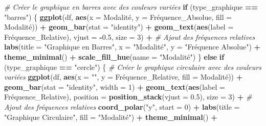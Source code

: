 \documentclass[
]{article}
\newenvironment{Shaded}{\begin{snugshade}}{\end{snugshade}}
\newcommand{\AttributeTok}[1]{\textcolor[rgb]{0.13,0.29,0.53}{#1}}
\newcommand{\CommentTok}[1]{\textcolor[rgb]{0.56,0.35,0.01}{\textit{#1}}}
\newcommand{\ControlFlowTok}[1]{\textcolor[rgb]{0.13,0.29,0.53}{\textbf{#1}}}
\newcommand{\DecValTok}[1]{\textcolor[rgb]{0.00,0.00,0.81}{#1}}
\newcommand{\FloatTok}[1]{\textcolor[rgb]{0.00,0.00,0.81}{#1}}
\newcommand{\FunctionTok}[1]{\textcolor[rgb]{0.13,0.29,0.53}{\textbf{#1}}}
\newcommand{\NormalTok}[1]{#1}
\newcommand{\SpecialCharTok}[1]{\textcolor[rgb]{0.81,0.36,0.00}{\textbf{#1}}}
\newcommand{\StringTok}[1]{\textcolor[rgb]{0.31,0.60,0.02}{#1}}
\begin{document}
\begin{Shaded}
\begin{Highlighting}[]
  \CommentTok{\# Créer le graphique en barres avec des couleurs variées}
  \ControlFlowTok{if}\NormalTok{ (type\_graphique }\SpecialCharTok{==} \StringTok{"barres"}\NormalTok{) \{}
    \FunctionTok{ggplot}\NormalTok{(df, }\FunctionTok{aes}\NormalTok{(}\AttributeTok{x =}\NormalTok{ Modalité, }\AttributeTok{y =}\NormalTok{ Fréquence\_Absolue, }\AttributeTok{fill =}\NormalTok{ Modalité)) }\SpecialCharTok{+}
      \FunctionTok{geom\_bar}\NormalTok{(}\AttributeTok{stat =} \StringTok{"identity"}\NormalTok{) }\SpecialCharTok{+}
      \FunctionTok{geom\_text}\NormalTok{(}\FunctionTok{aes}\NormalTok{(}\AttributeTok{label =}\NormalTok{ Fréquence\_Relative), }\AttributeTok{vjust =} \SpecialCharTok{{-}}\FloatTok{0.5}\NormalTok{, }\AttributeTok{size =} \DecValTok{3}\NormalTok{) }\SpecialCharTok{+} \CommentTok{\# Ajout des fréquences relatives}
      \FunctionTok{labs}\NormalTok{(}\AttributeTok{title =} \StringTok{"Graphique en Barres"}\NormalTok{, }\AttributeTok{x =} \StringTok{"Modalité"}\NormalTok{, }\AttributeTok{y =} \StringTok{"Fréquence Absolue"}\NormalTok{) }\SpecialCharTok{+}
      \FunctionTok{theme\_minimal}\NormalTok{() }\SpecialCharTok{+}
      \FunctionTok{scale\_fill\_hue}\NormalTok{(}\AttributeTok{name =} \StringTok{"Modalité"}\NormalTok{)}
\NormalTok{  \} }\ControlFlowTok{else} \ControlFlowTok{if}\NormalTok{ (type\_graphique }\SpecialCharTok{==} \StringTok{"cercle"}\NormalTok{) \{}
    \CommentTok{\# Créer le graphique circulaire avec des couleurs variées}
    \FunctionTok{ggplot}\NormalTok{(df, }\FunctionTok{aes}\NormalTok{(}\AttributeTok{x =} \StringTok{""}\NormalTok{, }\AttributeTok{y =}\NormalTok{ Fréquence\_Relative, }\AttributeTok{fill =}\NormalTok{ Modalité)) }\SpecialCharTok{+}
      \FunctionTok{geom\_bar}\NormalTok{(}\AttributeTok{stat =} \StringTok{"identity"}\NormalTok{, }\AttributeTok{width =} \DecValTok{1}\NormalTok{) }\SpecialCharTok{+}
      \FunctionTok{geom\_text}\NormalTok{(}\FunctionTok{aes}\NormalTok{(}\AttributeTok{label =}\NormalTok{ Fréquence\_Relative), }\AttributeTok{position =} \FunctionTok{position\_stack}\NormalTok{(}\AttributeTok{vjust =} \FloatTok{0.5}\NormalTok{), }\AttributeTok{size =} \DecValTok{3}\NormalTok{) }\SpecialCharTok{+} \CommentTok{\# Ajout des fréquences relatives}
      \FunctionTok{coord\_polar}\NormalTok{(}\StringTok{"y"}\NormalTok{, }\AttributeTok{start =} \DecValTok{0}\NormalTok{) }\SpecialCharTok{+}
      \FunctionTok{labs}\NormalTok{(}\AttributeTok{title =} \StringTok{"Graphique Circulaire"}\NormalTok{, }\AttributeTok{fill =} \StringTok{"Modalité"}\NormalTok{) }\SpecialCharTok{+}
      \FunctionTok{theme\_minimal}\NormalTok{() }\SpecialCharTok{+}

\end{Highlighting}
\end{Shaded}
\end{document}

